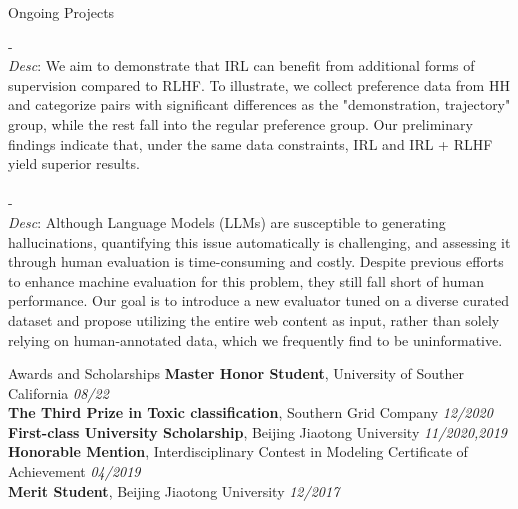 \documentclass{resume} %
\begin{document}
\begin{rSection}{Ongoing Projects}

- \textbf{}\\
\textit{Desc}: We aim to demonstrate that IRL can benefit from additional forms of supervision compared to RLHF. To illustrate, we collect preference data from HH and categorize pairs with significant differences as the "demonstration, trajectory" group, while the rest fall into the regular preference group. Our preliminary findings indicate that, under the same data constraints, IRL and IRL + RLHF yield superior results.\\
\vspace{-10pt} \\
- \textbf{}\\
\textit{Desc}: Although Language Models (LLMs) are susceptible to generating hallucinations, quantifying this issue automatically is challenging, and assessing it through human evaluation is time-consuming and costly. Despite previous efforts to enhance machine evaluation for this problem, they still fall short of human performance. Our goal is to introduce a new evaluator tuned on a diverse curated dataset and propose utilizing the entire web content as input, rather than solely relying on human-annotated data, which we frequently find to be uninformative.



\end{rSection}
\begin{rSection}{Awards and Scholarships} 
{\bf Master Honor Student}{, University of Souther California
} \hfill{\em 08/22}\\
{\bf The Third Prize in Toxic classification}{, Southern Grid Company
} \hfill{\em 12/2020}\\
{\bf First-class University Scholarship}{, Beijing Jiaotong University
} \hfill{\em 11/2020,2019}\\
{\bf Honorable Mention}{, Interdisciplinary Contest in Modeling Certificate of Achievement
} \hfill{\em 04/2019}\\
{\bf Merit Student}{, Beijing Jiaotong University
} \hfill{\em 12/2017}\\
\end{rSection}
\end{document}
